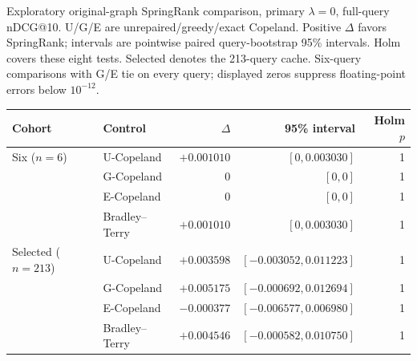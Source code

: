 \begin{supplementtable}
  \caption{Exploratory original-graph SpringRank comparison, primary
    $\lambda=0$, full-query nDCG@10. U/G/E are unrepaired/greedy/exact
    Copeland. Positive $\Delta$ favors SpringRank; intervals are pointwise
    paired query-bootstrap 95\% intervals. Holm covers these eight tests.
    Selected denotes the 213-query cache. Six-query comparisons with G/E tie on every query; displayed zeros
    suppress floating-point errors below $10^{-12}$.}
  \label{tab:springrank}
  \sncstable
  \begin{tabularx}{\linewidth}{@{}L{2.05cm}Yrrr@{}}
    \toprule
    Cohort & Control & $\Delta$ & 95\% interval & Holm $p$ \\
    \midrule
    Six ($n=6$) & U-Copeland & $+0.001010$ & $[0,0.003030]$ & 1 \\
     & G-Copeland & $0$ & $[0,0]$ & 1 \\
     & E-Copeland & $0$ & $[0,0]$ & 1 \\
     & Bradley--Terry & $+0.001010$ & $[0,0.003030]$ & 1 \\
    \midrule
    Selected ($n=213$) & U-Copeland & $+0.003598$ & $[-0.003052,0.011223]$ & 1 \\
     & G-Copeland & $+0.005175$ & $[-0.000692,0.012694]$ & 1 \\
     & E-Copeland & $-0.000377$ & $[-0.006577,0.006980]$ & 1 \\
     & Bradley--Terry & $+0.004546$ & $[-0.000582,0.010750]$ & 1 \\
    \bottomrule
  \end{tabularx}
\end{supplementtable}